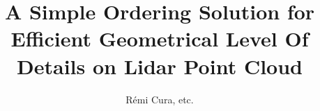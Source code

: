 
	

\title{ A Simple Ordering Solution for Efficient Geometrical Level Of Details on Lidar Point Cloud}
\author{R\'emi Cura, etc.}



\maketitle
\tableofcontents
\newpage


	
	\newpage

	
	\newpage

	
	\newpage
	
	
	\newpage

%	
	\newpage
 
%	
	\newpage

	
	\newpage

%	
%


%	
%		
%
%	 	
%		





